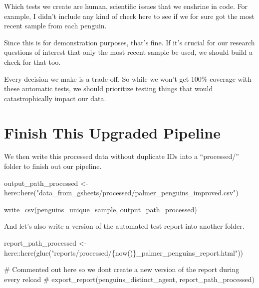 \documentclass[
  letterpaper,
  DIV=11,
  numbers=noendperiod]{scrreprt}
\newenvironment{Shaded}{\begin{snugshade}}{\end{snugshade}}
\newcommand{\CommentTok}[1]{\textcolor[rgb]{0.37,0.37,0.37}{#1}}
\newcommand{\FunctionTok}[1]{\textcolor[rgb]{0.28,0.35,0.67}{#1}}
\newcommand{\NormalTok}[1]{\textcolor[rgb]{0.00,0.23,0.31}{#1}}
\newcommand{\OtherTok}[1]{\textcolor[rgb]{0.00,0.23,0.31}{#1}}
\newcommand{\SpecialCharTok}[1]{\textcolor[rgb]{0.37,0.37,0.37}{#1}}
\newcommand{\StringTok}[1]{\textcolor[rgb]{0.13,0.47,0.30}{#1}}
\begin{document}
Which tests we create are human, scientific issues that we enshrine in
code. For example, I didn't include any kind of check here to see if we
for sure got the most recent sample from each penguin.

Since this is for demonstration purposes, that's fine. If it's crucial
for our research questions of interest that only the most recent sample
be used, we should build a check for that too.

Every decision we make is a trade-off. So while we won't get 100\%
coverage with these automatic tests, we should prioritize testing things
that would catastrophically impact our data.

\hypertarget{finish-this-upgraded-pipeline}{%
\section{Finish This Upgraded
Pipeline}\label{finish-this-upgraded-pipeline}}

We then write this processed data without duplicate IDs into a
``processed/'' folder to finish out our pipeline.

\begin{Shaded}
\begin{Highlighting}[]
\NormalTok{output\_path\_processed }\OtherTok{\textless{}{-}}\NormalTok{ here}\SpecialCharTok{::}\FunctionTok{here}\NormalTok{(}\StringTok{"data\_from\_gsheets/processed/palmer\_penguins\_improved.csv"}\NormalTok{)}

\FunctionTok{write\_csv}\NormalTok{(penguins\_unique\_sample, output\_path\_processed)}
\end{Highlighting}
\end{Shaded}

And let's also write a version of the automated test report into another
folder.

\begin{Shaded}
\begin{Highlighting}[]
\NormalTok{report\_path\_processed }\OtherTok{\textless{}{-}}\NormalTok{ here}\SpecialCharTok{::}\FunctionTok{here}\NormalTok{(}\FunctionTok{glue}\NormalTok{(}\StringTok{"reports/processed/\{now()\}\_palmer\_penguins\_report.html"}\NormalTok{))}

\CommentTok{\# Commented out here so we don\textquotesingle{}t create a new version of the report during every reload}
\CommentTok{\# export\_report(penguins\_distinct\_agent, report\_path\_processed)}
\end{Highlighting}
\end{Shaded}
\end{document}
